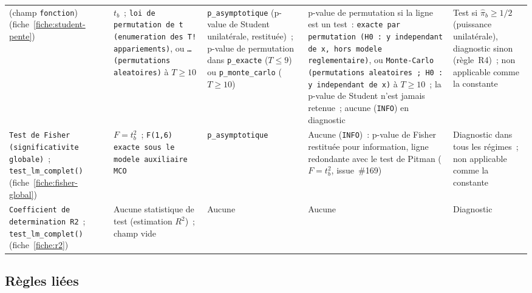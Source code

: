 \documentclass[a4paper,11pt]{article}
\newcommand{\code}[1]{\texttt{\small #1}}
\begin{document}
\begin{center}
\begin{longtable}{@{}>{\raggedright\arraybackslash}p{3.3cm}>{\raggedright\arraybackslash}p{3.5cm}>{\raggedright\arraybackslash}p{2.7cm}>{\raggedright\arraybackslash}p{3.7cm}>{\raggedright\arraybackslash}p{2.0cm}@{}}
(champ \code{fonction}) (fiche~\ref{fiche:student-pente}) &
$t_b$~; \code{loi de permutation de t (enumeration des T! appariements)}, ou \code{\dots{}
(permutations aleatoires)} à $T \ge 10$ &
\code{p\_asymptotique} (p-value de Student unilatérale, restituée)~; p-value de permutation dans
\code{p\_exacte} ($T \le 9$) ou \code{p\_monte\_carlo} ($T \ge 10$) &
p-value de permutation si la ligne est un test~: \code{exacte par permutation (H0 : y
independant de x, hors modele reglementaire)}, ou \code{Monte-Carlo (permutations aleatoires ;
H0 : y independant de x)} à $T \ge 10$~; la p-value de Student n'est jamais retenue~; aucune
(\code{INFO}) en diagnostic &
Test si $\hat\pi_b \ge 1/2$ (puissance unilatérale), diagnostic sinon (règle~R4)~; non
applicable comme la constante \\
\code{Test de Fisher (significativite globale)}~; \code{test\_lm\_complet()}
(fiche~\ref{fiche:fisher-global}) &
$F = t_b^2$~; \texttt{\small F(1,6) exacte sous le modele auxiliaire MCO} & %
\code{p\_asymptotique} &
Aucune (\code{INFO})~: p-value de Fisher restituée pour information, ligne redondante avec le
test de Pitman ($F = t_b^2$, issue~\#169) &
Diagnostic dans tous les régimes~; non applicable comme la constante \\
\code{Coefficient de determination R2}~; \code{test\_lm\_complet()} (fiche~\ref{fiche:r2}) &
Aucune statistique de test (estimation $R^2$)~; champ vide &
Aucune &
Aucune &
Diagnostic \\
\end{longtable}
\end{center}

\subsection{Règles liées}
\label{sec:modele-auxiliaire-regles}
\end{document}
